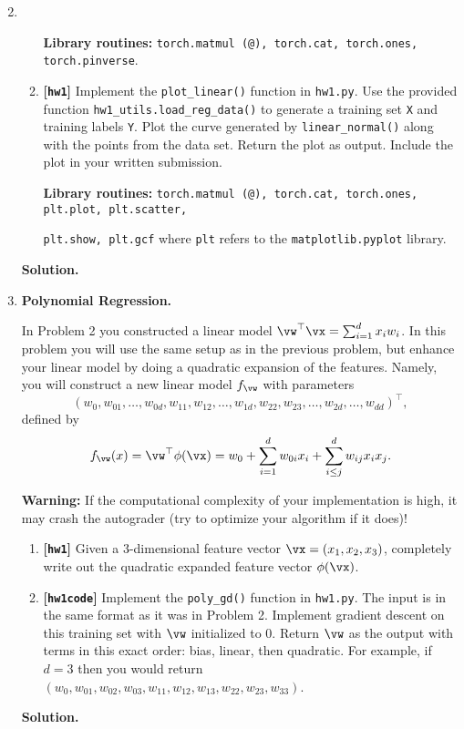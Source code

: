 \documentclass{article}
\def\hw{\textbf{[\texttt{hw1}]}\xspace}
\def\hwcode{\textbf{[\texttt{hw1code}]}\xspace}
\theoremstyle{definition}
\theoremstyle{remark}
\newenvironment{Q}
{%
  \clearpage
  \item
  }
  {%
    \phantom{s} %
    \bigskip
    \textbf{Solution.}
  }
\begin{document}
\begin{enumerate}[font={\Large\bfseries},left=0pt]
\begin{Q}
\begin{enumerate}
          \textbf{Library routines:} \texttt{torch.matmul (@), torch.cat, torch.ones, torch.pinverse}.

        \item \hw Implement the \texttt{plot\_linear()} function in \texttt{hw1.py}.  Use the provided function \texttt{hw1\_utils.load\_reg\_data()} to generate a training set \texttt{X} and training labels \texttt{Y}. Plot the curve generated by \texttt{linear\_normal()} along with the points from the data set.  Return the plot as output.  Include the plot in your written submission.

          \textbf{Library routines:} \texttt{torch.matmul (@), torch.cat, torch.ones, plt.plot, plt.scatter,}

          \texttt{plt.show, plt.gcf} where \texttt{plt} refers to the \texttt{matplotlib.pyplot} library.
      \end{enumerate}
    \end{Q}

    \begin{Q}
  \textbf{\Large Polynomial Regression.}

  In Problem 2 you constructed a linear model $\vw^\top \vx = \sum_{i=1}^d x_i w_i$.  In this problem you will use the same setup as in the previous problem, but enhance your linear model by doing a quadratic expansion of the features.  Namely, you will construct a new linear model $f_{\vw}$ with parameters
  \[
    (w_{0}, w_{01},\dots,w_{0d},w_{11}, w_{12},\dots,w_{1d},w_{22}, w_{23},\dots,w_{2d},\dots, w_{dd})^\top,
  \]
    defined by
  	\begin{align*}
  	f_{\vw}(x) = \vw^\top \phi(\vx) = w_0 + \sum_{i=1}^d w_{0i} x_i + \sum_{i\leq j}^dw_{ij} x_ix_j.
  	\end{align*}
  	
 \textbf{Warning:} If the computational complexity of your implementation is high, it may crash the autograder (try to optimize your algorithm if it does)!
  \begin{enumerate}
 \item \hw Given a $3$-dimensional feature vector $\vx = (x_1,x_2,x_3)$, completely write out the quadratic expanded feature vector $\phi(\vx)$.
  \item \hwcode Implement the \texttt{poly\_gd()} function in \texttt{hw1.py}.  The input is in the same format as it was in Problem 2.  Implement gradient descent on this training set with $\vw$ initialized to 0.  Return $\vw$ as the output with terms in this exact order: bias, linear, then quadratic.  For example, if $d = 3$ then you would return $(w_0, w_{01},w_{02},w_{03},w_{11},w_{12},w_{13},w_{22},w_{23},w_{33})$.
  

\end{enumerate}
\end{Q}
\end{enumerate}
\end{document}
